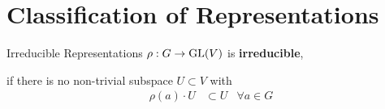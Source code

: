 
\section{Classification of Representations}

%
%
%

\begin{frame}{Irreducible Representations}
    \large
    $\rho: G \to \operatorname{GL}(V)$ is \textbf{irreducible},
    
    \pause
    if there is no non-trivial subspace $U \subset V$ with
    \pause
    \begin{align*}
        \rho(a) \cdot U & \subset U & \forall a \in G
    \end{align*}

    \normalsize
    {\hspace*{\fill} \cite{hein2013}}

\end{frame}

